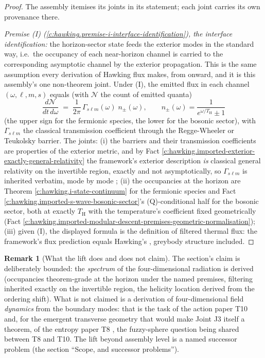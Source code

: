 \documentclass[11pt]{article}
\theoremstyle{definition}
\newtheorem{remark}[theorem]{Remark}
\theoremstyle{plain}
\providecommand{\TH}{}\renewcommand{\TH}{T_{\mathrm{H}}}
\begin{document}
\begin{proof}
The assembly itemises its joints in its statement; each joint carries its own provenance there.

\emph{Premise (I) (\ref{c:hawking.premise-i-interface-identification}), the interface identification:} the horizon-sector state feeds the exterior modes in the standard way, i.e.\ the occupancy of each near-horizon channel is carried to the corresponding asymptotic channel by the exterior propagation. This is the same assumption every derivation of Hawking flux makes, from \cite{Hawking1975} onward, and it is this assembly's one non-theorem joint. Under (I), the emitted flux in each channel $(\omega, \ell, m, s)$ equals (with $\mathcal{N}$ the count of emitted quanta)
\[
\frac{d\mathcal{N}}{dt\,d\omega} \;=\; \frac{1}{2\pi}\,\Gamma_{s\ell m}(\omega)\; n_\pm(\omega), \qquad
n_\pm(\omega) = \frac{1}{e^{\omega/\TH} \pm 1}
\]
(the upper sign for the fermionic species, the lower for the bosonic sector), with $\Gamma_{s\ell m}$ the classical transmission coefficient through the Regge-Wheeler or Teukolsky barrier. The joints: (i) the barriers and their transmission coefficients are properties of the exterior metric, and by Fact \ref{c:hawking.imported-exterior-exactly-general-relativity} the framework's exterior description \emph{is} classical general relativity on the invertible region, exactly and not asymptotically, so $\Gamma_{s\ell m}$ is inherited verbatim, mode by mode \cite{ReggeWheeler1957, Teukolsky1973}; (ii) the occupancies at the horizon are Theorem \ref{c:hawking.i-state-continuum} for the fermionic species and Fact \ref{c:hawking.imported-s-wave-bosonic-sector}'s (Q)-conditional half for the bosonic sector, both at exactly $\TH$ with the temperature's coefficient fixed geometrically (Fact \ref{c:hawking.imported-modular-descent-premises-geometric-normalisation}); (iii) given (I), the displayed formula is the definition of filtered thermal flux: the framework's flux prediction equals Hawking's \cite{Hawking1975, Page1976}, greybody structure included.

\end{proof}

\begin{remark}[What the lift does and does not claim]\label{c:note.hawking.what-lift-does-does-not-claim}
The section's claim is deliberately bounded: the \emph{spectrum} of the four-dimensional radiation is derived (occupancies theorem-grade at the horizon under the named premises, filtering inherited exactly on the invertible region, the helicity location derived from the ordering shift). What is not claimed is a derivation of four-dimensional field \emph{dynamics} from the boundary modes: that is the task of the action paper T10 \cite{ButlerT10} and, for the emergent transverse geometry that would make Joint J3 itself a theorem, of the entropy paper T8 \cite{ButlerT8}, the fuzzy-sphere question being shared between T8 and T10. The lift beyond assembly level is a named successor problem (the section ``Scope, and successor problems'').
\end{remark}
\end{document}
